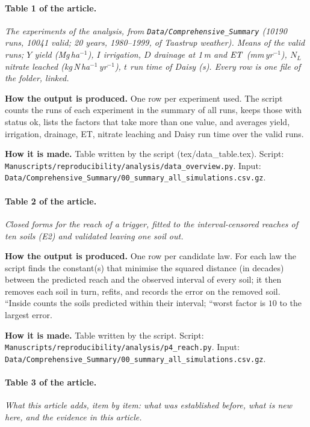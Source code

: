 \paragraph{Table 1 of the article.} \emph{The experiments of the analysis, from \nolinkurl{Data/Comprehensive_Summary} (10190 runs, 10041 valid; 20 years, 1980--1999, of Taastrup weather). Means of the valid runs; $Y$ yield (Mg\,ha$^{-1}$), $I$ irrigation, $D$ drainage at 1\,m and $\mathit{ET}$ (mm\,yr$^{-1}$), $N_L$ nitrate leached (kg\,N\,ha$^{-1}$\,yr$^{-1}$), $t$ run time of Daisy (s). Every row is one file of the folder, linked.}

\textbf{How the output is produced.} One row per experiment used. The script counts the runs of each experiment in the summary of all runs, keeps those with status ok, lists the factors that take more than one value, and averages yield, irrigation, drainage, ET, nitrate leaching and Daisy run time over the valid runs.

\textbf{How it is made.} Table written by the script (tex/data\_table.tex). Script: \nolinkurl{Manuscripts/reproducibility/analysis/data_overview.py}. Input: \nolinkurl{Data/Comprehensive_Summary/00_summary_all_simulations.csv.gz}.

\paragraph{Table 2 of the article.} \emph{Closed forms for the reach of a trigger, fitted to the interval-censored reaches of ten soils (E2) and validated leaving one soil out.}

\textbf{How the output is produced.} One row per candidate law. For each law the script finds the constant(s) that minimise the squared distance (in decades) between the predicted reach and the observed interval of every soil; it then removes each soil in turn, refits, and records the error on the removed soil. ``Inside counts the soils predicted within their interval; ``worst factor is $10$ to the largest error.

\textbf{How it is made.} Table written by the script. Script: \nolinkurl{Manuscripts/reproducibility/analysis/p4_reach.py}. Input: \nolinkurl{Data/Comprehensive_Summary/00_summary_all_simulations.csv.gz}.

\paragraph{Table 3 of the article.} \emph{What this article adds, item by item: what was established before, what is new here, and the evidence in this article.}

